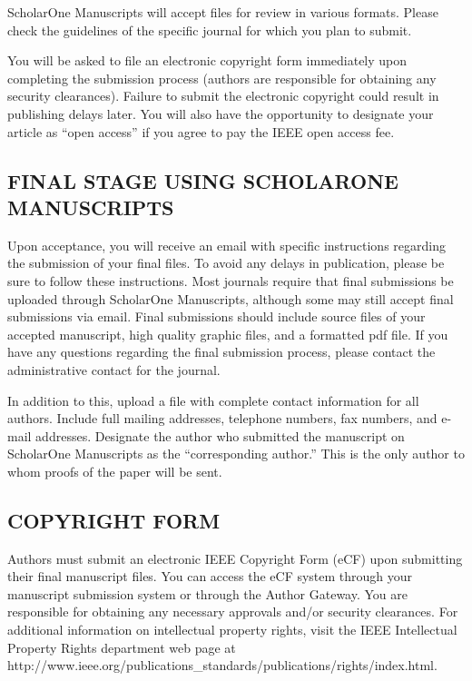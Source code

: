 \documentclass{IEEEjmw}
\begin{document}
ScholarOne Manuscripts will accept files for review in various formats. Please check the guidelines of the specific journal for which you plan to submit. 

You will be asked to file an electronic copyright form immediately upon completing the submission process (authors are responsible for obtaining any security clearances). Failure to submit the electronic copyright could result in publishing delays later. You will also have the opportunity to designate your article as ``open access'' if you agree to pay the IEEE open access fee. 

\subsection{FINAL STAGE USING SCHOLARONE MANUSCRIPTS}

Upon acceptance, you will receive an email with specific instructions regarding the submission of your final files. To avoid any delays in publication, please be sure to follow these instructions. Most journals require that final submissions be uploaded through ScholarOne Manuscripts, although some may still accept final submissions via email. Final submissions should include source files of your accepted manuscript, high quality graphic files, and a formatted pdf file. If you have any questions regarding the final submission process, please contact the administrative contact for the journal. 

In addition to this, upload a file with complete contact information for all authors. Include full mailing addresses, telephone numbers, fax numbers, and e-mail addresses. Designate the author who submitted the manuscript on ScholarOne Manuscripts as the ``corresponding author.'' This is the only author to whom proofs of the paper will be sent. 

\subsection{COPYRIGHT FORM}

Authors must submit an electronic IEEE Copyright Form (eCF) upon submitting their final manuscript files. You can access the eCF system through your manuscript submission system or through the Author Gateway. You are responsible for obtaining any necessary approvals and/or security clearances. For additional information on intellectual property rights, visit the IEEE Intellectual Property Rights department web page at http://www.ieee.org/publications\_standards/\break publications/rights/index.html. 
\end{document}
